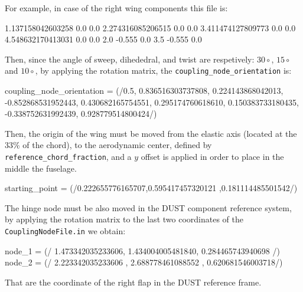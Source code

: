 \begin{itemize}
    For example, in case of the right wing components this file is: 
    \begin{inputfile}[frame=single]
      1.137158042603258  0.0    0.0 
      2.274316085206515  0.0    0.0 
      3.411474127809773  0.0    0.0 
      4.548632170413031  0.0    0.0   
      2.0     -0.555  0.0
      3.5     -0.555  0.0
    \end{inputfile}
    Then, since the angle of sweep, dihededral, and twist are respetively: $30\circ$, $15\circ$ and $10\circ$, by applying the rotation matrix, the \texttt{coupling_node_orientation} is: 
    \begin{inputfile}[frame=single]
      coupling_node_orientation = 
      (/0.5,   0.836516303737808,   0.224143868042013, 
      -0.852868531952443,   0.430682165754551,   0.295174760618610, 
      0.150383733180435,  -0.338752631992439,   0.928779514800424/)
    \end{inputfile}
    Then, the origin of the wing must be moved from the elastic axis (located at the 33\% of the chord), to the aerodynamic center, defined by \texttt{reference_chord_fraction}, and a $y$ offset is applied in order to place in the middle the fuselage. 
    \begin{inputfile}[frame=single]
      starting_point = (/0.222655776165707,0.595417457320121 ,0.181114485501542/)
    \end{inputfile}
    The hinge node must be also moved in the DUST component reference system, by applying the rotation matrix to the last two coordinates of the \texttt{CouplingNodeFile.in} we obtain: 
    \begin{inputfile}[frame=single]
      node_1 = (/ 1.473342035233606, 1.434004005481840, 0.284465743940698  /)  
      node_2 = (/ 2.223342035233606  , 2.688778461088552  , 0.620681546003718/)
    \end{inputfile}
    That are the coordinate of the right flap in the DUST reference frame. 
\end{itemize}
